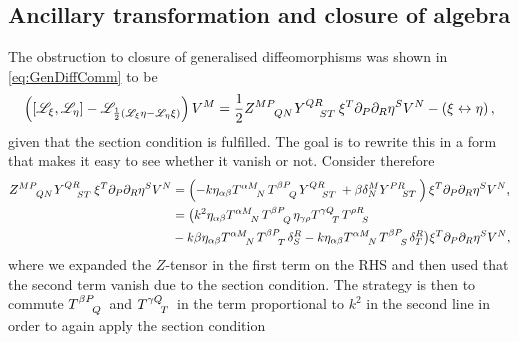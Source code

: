 \subsection{Ancillary transformation and closure of algebra\label{sec:AncillaryTransformationsAndClosure}}
The obstruction to closure of generalised diffeomorphisms was shown in \eqref{eq:GenDiffComm} to be  
\begin{equation}\label{eq:GenDiffComm2}
    \left(\left[\mathscr{L}_\xi,\mathscr{L}_\eta\right]-\mathscr{L}_{\frac{1}{2}\left(\mathscr{L}_\xi\eta-\mathscr{L}_\eta\xi\right)}\right)V^M = \frac{1}{2}\tensor{Z}{^{MP}_{QN}}\tensor{Y}{^{QR}_{ST}}\xi^T\pd_P\pd_R\eta^SV^N-\left(\xi\leftrightarrow\eta\right),
\end{equation}
given that the section condition is fulfilled. The goal is to rewrite this in a form that makes it easy to see whether it vanish or not. Consider therefore
\begin{equation}\label{eq:RemainderTermGauge}
    \begin{aligned}
        \tensor{Z}{^{MP}_{QN}}\tensor{Y}{^{QR}_{ST}}\xi^T\pd_P\pd_R\eta^SV^N &= \left(-k\eta_{\alpha\beta}\tensor{T}{^{\alpha M}_N}\tensor{T}{^{\beta P}_Q}\tensor{Y}{^{QR}_{ST}}+\beta \delta^M_N\tensor{Y}{^{PR}_{ST}}\right)\xi^T\pd_P\pd_R\eta^SV^N,\\
        &= \big(k^2\eta_{\alpha\beta}\tensor{T}{^{\alpha M}_N}\tensor{T}{^{\beta P}_Q}\eta_{\gamma\rho}\tensor{T}{^{\gamma Q}_T}\tensor{T}{^{\rho R}_S}\\
        &-k\beta\eta_{\alpha\beta}\tensor{T}{^{\alpha M}_N}\tensor{T}{^{\beta P}_T}\delta^R_S-k\eta_{\alpha\beta}\tensor{T}{^{\alpha M}_N}\tensor{T}{^{\beta P}_S}\delta^{R}_T\big)\xi^T\pd_P\pd_R\eta^SV^N,
    \end{aligned}
\end{equation}
where we expanded the $Z$-tensor in the first term on the RHS and then used that the second term vanish due to the section condition. The strategy is then to commute $\tensor{T}{^{\beta P}_Q}$ and $\tensor{T}{^{\gamma Q}_T}$ in the term proportional to $k^2$ in the second line in order to again apply the section condition
